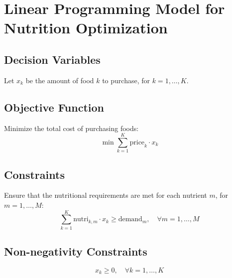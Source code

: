 \documentclass{article}
\begin{document}
\section*{Linear Programming Model for Nutrition Optimization}

\subsection*{Decision Variables}
Let \( x_k \) be the amount of food \( k \) to purchase, for \( k = 1, \ldots, K \).

\subsection*{Objective Function}
Minimize the total cost of purchasing foods:
\[
\min \sum_{k=1}^{K} \text{price}_k \cdot x_k
\]

\subsection*{Constraints}
Ensure that the nutritional requirements are met for each nutrient \( m \), for \( m = 1, \ldots, M \):
\[
\sum_{k=1}^{K} \text{nutri}_{k, m} \cdot x_k \geq \text{demand}_m, \quad \forall m = 1, \ldots, M
\]

\subsection*{Non-negativity Constraints}
\[
x_k \geq 0, \quad \forall k = 1, \ldots, K
\]
\end{document}
